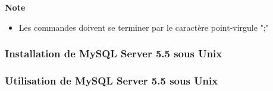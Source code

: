  \textbf{Note}
 \begin{itemize}
 \item Les commandes doivent se terminer par le caractère point-virgule ";"
 \end{itemize}

 \subsubsection{Installation de MySQL Server 5.5 sous Unix} 

 \subsubsection{Utilisation de MySQL Server 5.5 sous Unix}